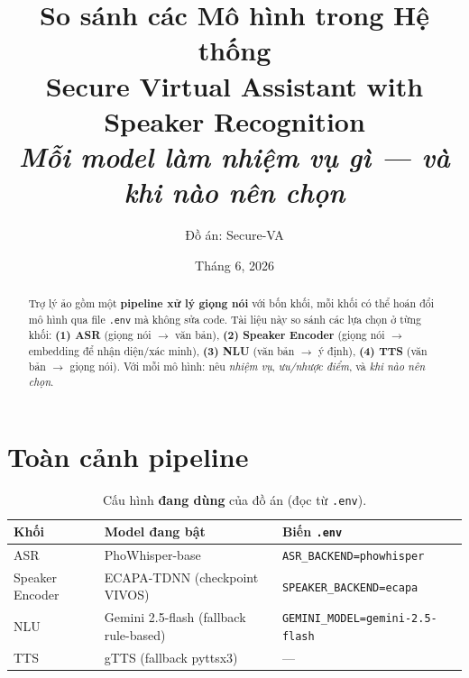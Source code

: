 \documentclass[12pt,a4paper]{article}
\title{\textbf{So sánh các Mô hình trong Hệ thống}\\[3pt]
\large Secure Virtual Assistant with Speaker Recognition\\
\large \textit{Mỗi model làm nhiệm vụ gì --- và khi nào nên chọn}}
\author{Đồ án: Secure-VA}
\date{Tháng 6, 2026}
\begin{document}
\maketitle

\begin{abstract}
\noindent Trợ lý ảo gồm một \textbf{pipeline xử lý giọng nói} với bốn khối, mỗi
khối có thể hoán đổi mô hình qua file \texttt{.env} mà không sửa code. Tài liệu
này so sánh các lựa chọn ở từng khối: \textbf{(1) ASR} (giọng nói $\to$ văn bản),
\textbf{(2) Speaker Encoder} (giọng nói $\to$ embedding để nhận diện/xác minh),
\textbf{(3) NLU} (văn bản $\to$ ý định), \textbf{(4) TTS} (văn bản $\to$ giọng
nói). Với mỗi mô hình: nêu \emph{nhiệm vụ}, \emph{ưu/nhược điểm}, và \emph{khi nào
nên chọn}.
\end{abstract}

\tableofcontents
\newpage

\section{Toàn cảnh pipeline}

\begin{center}
\end{center}

\begin{table}[H]
\centering
\caption{Cấu hình \textbf{đang dùng} của đồ án (đọc từ \texttt{.env}).}
\begin{tabular}{lll}
\toprule
\textbf{Khối} & \textbf{Model đang bật} & \textbf{Biến \texttt{.env}} \\
\midrule
ASR             & PhoWhisper-base & \texttt{ASR\_BACKEND=phowhisper} \\
Speaker Encoder & ECAPA-TDNN (checkpoint VIVOS) & \texttt{SPEAKER\_BACKEND=ecapa} \\
NLU             & Gemini 2.5-flash (fallback rule-based) & \texttt{GEMINI\_MODEL=gemini-2.5-flash} \\
TTS             & gTTS (fallback pyttsx3) & --- \\
\bottomrule
\end{tabular}
\end{table}
\end{document}
